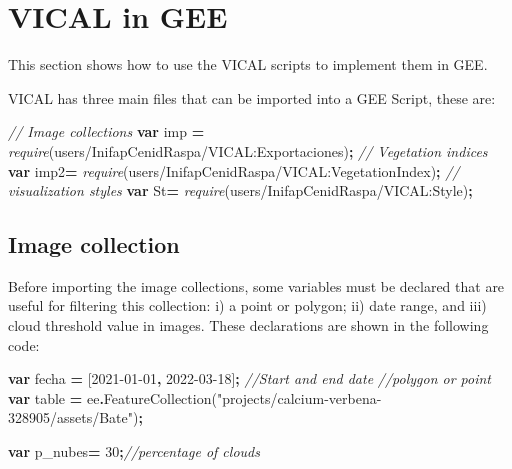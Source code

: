 \documentclass[
]{book}
\newenvironment{Shaded}{\begin{snugshade}}{\end{snugshade}}
\newcommand{\CommentTok}[1]{\textcolor[rgb]{0.56,0.35,0.01}{\textit{#1}}}
\newcommand{\DecValTok}[1]{\textcolor[rgb]{0.00,0.00,0.81}{#1}}
\newcommand{\FunctionTok}[1]{\textcolor[rgb]{0.00,0.00,0.00}{#1}}
\newcommand{\KeywordTok}[1]{\textcolor[rgb]{0.13,0.29,0.53}{\textbf{#1}}}
\newcommand{\NormalTok}[1]{#1}
\newcommand{\OperatorTok}[1]{\textcolor[rgb]{0.81,0.36,0.00}{\textbf{#1}}}
\newcommand{\PreprocessorTok}[1]{\textcolor[rgb]{0.56,0.35,0.01}{\textit{#1}}}
\newcommand{\StringTok}[1]{\textcolor[rgb]{0.31,0.60,0.02}{#1}}
\begin{document}
\hypertarget{vical-in-gee}{%
\chapter{VICAL in GEE}\label{vical-in-gee}}

This section shows how to use the VICAL scripts to implement them in GEE.

VICAL has three main files that can be imported into a GEE Script, these are:

\begin{Shaded}
\begin{Highlighting}[]
\CommentTok{// Image collections}
\KeywordTok{var}\NormalTok{ imp }\OperatorTok{=} \PreprocessorTok{require}\NormalTok{(}\StringTok{\textquotesingle{}users/InifapCenidRaspa/VICAL:Exportaciones\textquotesingle{}}\NormalTok{)}\OperatorTok{;}
\CommentTok{// Vegetation indices}
\KeywordTok{var}\NormalTok{ imp2}\OperatorTok{=} \PreprocessorTok{require}\NormalTok{(}\StringTok{\textquotesingle{}users/InifapCenidRaspa/VICAL:VegetationIndex\textquotesingle{}}\NormalTok{)}\OperatorTok{;} 
\CommentTok{// visualization styles}
\KeywordTok{var}\NormalTok{ St}\OperatorTok{=} \PreprocessorTok{require}\NormalTok{(}\StringTok{\textquotesingle{}users/InifapCenidRaspa/VICAL:Style\textquotesingle{}}\NormalTok{)}\OperatorTok{;}
\end{Highlighting}
\end{Shaded}

\hypertarget{CImg}{%
\section{Image collection}\label{CImg}}

Before importing the image collections, some variables must be declared that are useful for filtering this collection: i) a point or polygon; ii) date range, and iii) cloud threshold value in images. These declarations are shown in the following code:

\begin{Shaded}
\begin{Highlighting}[]
\KeywordTok{var}\NormalTok{ fecha }\OperatorTok{=}\NormalTok{ [}\StringTok{\textquotesingle{}2021{-}01{-}01\textquotesingle{}}\OperatorTok{,} \StringTok{\textquotesingle{}2022{-}03{-}18\textquotesingle{}}\NormalTok{]}\OperatorTok{;} \CommentTok{//Start and end date }
\CommentTok{//polygon or point}
\KeywordTok{var}\NormalTok{ table }\OperatorTok{=}\NormalTok{ ee}\OperatorTok{.}\FunctionTok{FeatureCollection}\NormalTok{(}\StringTok{"projects/calcium{-}verbena{-}328905/assets/Bate"}\NormalTok{)}\OperatorTok{;}

\KeywordTok{var}\NormalTok{ p\_nubes}\OperatorTok{=} \DecValTok{30}\OperatorTok{;}\CommentTok{//percentage of clouds}
\end{Highlighting}
\end{Shaded}
\end{document}
